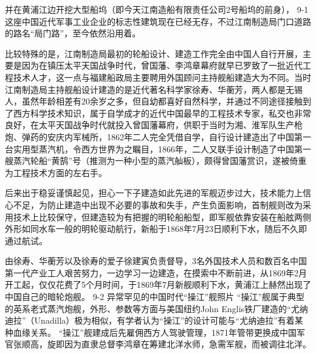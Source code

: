 \documentclass[12pt,UTF8]{ctexbook}
\begin{document}
并在黄浦江边开挖大型船坞（即今天江南造船有限责任公司2号船坞的前身），
9-1
这座中国近代军事工业企业的标志性建筑现在已经无存，不过江南制造局门口道路的路名“局门路”，至今依然沿用着。

比较特殊的是，江南制造局最初的轮船设计、建造工作完全由中国人自行开展，主要是因为在镇压太平天国战争时代，曾国藩、李鸿章幕府就早已罗致了一批近代工程技术人才，这一点与福建船政局主要聘用外国顾问主持舰船建造大为不同。当时江南制造局主持舰船设计建造的是近代著名科学家徐寿、华蘅芳，两人都是无锡人，虽然年龄相差有20余岁之多，但自幼都喜好自然科学，并通过不同途径接触到了西方科学技术知识，属于自学成才的近代中国最早的工程技术专家，私交也非常良好，在太平天国战争时代就投入曾国藩幕府，供职于当时为湘、淮军队生产枪炮、弹药的安庆内军械所，1862年二人完全凭借自学，自行设计建造出了中国第一台实用型蒸汽机，令西方世界为之瞩目，1866年，二人又联手设计制造了中国第一艘蒸汽轮船“黄鹄”号（推测为一种小型的蒸汽舢板），颇得曾国藩赏识，遂被倚重为工程技术方面的左右手。

后来出于稳妥谨慎起见，担心一下子建造如此先进的军舰迈步过大，技术能力上信心不足，为防止建造中出现不必要的事故和失手，产生负面影响，首制舰则改为采用技术上比较保守，但建造较为有把握的明轮船船型，即军舰依靠安装在船舷两侧外形如同水车一般的明轮驱动航行，新船于1868年7月23日顺利下水，随后不久即通过航试。

由徐寿、华蘅芳以及徐寿的爱子徐建寅负责督导，3名外国技术人员和数百名中国第一代产业工人艰苦努力，一边学习一边建造，在摸索中不断前进，从1869年2月开工起，仅仅花费了5个月时间，于1869年7月新舰顺利下水，黄浦江上赫然出现了中国自己的暗轮炮舰。
9-2 异常罕见的中国时代“操江”舰照片
“操江”舰属于典型的英系老式蒸汽炮舰，外形、参数等方面与美国纽约John Englis铁厂建造的“尤纳迪拉”（Unadilla）极为相似，有学者认为“操江”的设计可能与“尤纳迪拉”有着某种血缘关系。 “操江”舰建成后先雇佣西方人驾驶管理，1871年管带更换成中国军官张顺高，旋即因为直隶总督李鸿章在筹建北洋水师，急需军舰，而被调往北洋。
\end{document}
